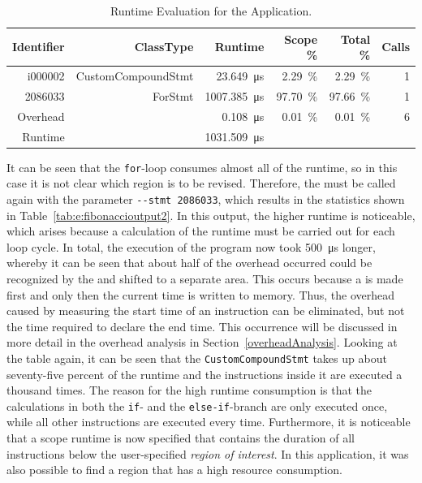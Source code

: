 \begin{table}
  \centering
    \caption{Runtime Evaluation for the \FIBONACCI Application.}
  \begin{tabular}{rrrrrr}
    \toprule
    Identifier & ClassType          & Runtime                       & Scope \%             & Total \%             & Calls \\
    \midrule
    i000002    & CustomCompoundStmt &  \SI{23.649}{\micro\second}   & \SI{2.29}{\percent}  & \SI{2.29}{\percent}  & 1     \\
    2086033    & ForStmt            &  \SI{1007.385}{\micro\second} & \SI{97.70}{\percent} & \SI{97.66}{\percent} & 1     \\
    Overhead   &                    &  \SI{0.108}{\micro\second}    & \SI{0.01}{\percent}  & \SI{0.01}{\percent}  & 6     \\
    \midrule
    Runtime    &                    &  \SI{1031.509}{\micro\second} &                      &                      &       \\
    \bottomrule
  \end{tabular}
  \label{tab:e:fibonaccioutput1}
\end{table}

It can be seen that the \lstinline{for}-loop consumes almost all of the runtime, so in this case it is not clear which region is to be revised. Therefore, the \TOOL must be called again with the parameter \lstinline{--stmt 2086033}, which results in the statistics shown in Table~\ref{tab:e:fibonaccioutput2}. In this output, the higher runtime is noticeable, which arises because a calculation of the runtime must be carried out for each loop cycle. In total, the execution of the program now took \SI{500}{\micro\second} longer, whereby it can be seen that about half of the overhead occurred could be recognized by the \TOOL and shifted to a separate area. This occurs because a \DECL is made first and only then the current time is written to memory. Thus, the overhead caused by measuring the start time of an instruction can be eliminated, but not the time required to declare the end time. This occurrence will be discussed in more detail in the overhead analysis in Section~\ref{overheadAnalysis}. Looking at the table again, it can be seen that the \lstinline{CustomCompoundStmt} takes up about seventy-five percent of the runtime and the instructions inside it are executed a thousand times. The reason for the high runtime consumption is that the calculations in both the \lstinline{if}- and the \lstinline{else-if}-branch are only executed once, while all other instructions are executed every time. Furthermore, it is noticeable that a scope runtime is now specified that contains the duration of all instructions below the user-specified \emph{region of interest}. In this application, it was also possible to find a region that has a high resource consumption. 

